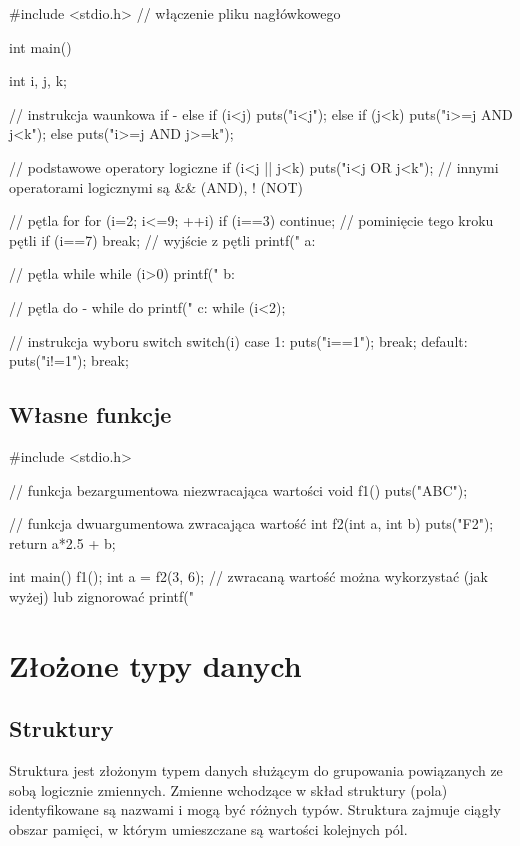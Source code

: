 \documentclass{pdfBooklets}
\begin{document}
\begin{CodeFrame*}[c]{}
#include <stdio.h> // włączenie pliku nagłówkowego

int main() {
    int i, j, k;
    
    // instrukcja waunkowa if - else
    if (i<j) {
        puts("i<j");
    } else if (j<k) {
        puts("i>=j AND j<k");
    } else {
        puts("i>=j AND j>=k");
    }
    
    // podstawowe operatory logiczne
    if (i<j || j<k)
        puts("i<j OR j<k");
    // innymi operatorami logicznymi są && (AND), ! (NOT)
    
    // pętla for
    for (i=2; i<=9; ++i) {
        if (i==3)
            continue; // pominięcie tego kroku pętli
        if (i==7)
            break; // wyjście z pętli
        printf(" a: %
    }
    
    // pętla while
    while (i>0) {
        printf(" b: %
    }
    
    // pętla do - while
    do {
        printf(" c: %
    } while (i<2);
    
    // instrukcja wyboru switch
    switch(i) {
        case 1:
            puts("i==1");
            break;
        default:
            puts("i!=1");
            break;
    }
}
\end{CodeFrame*}

\subsection{Własne funkcje}

\begin{CodeFrame*}[c]{}
#include <stdio.h>

// funkcja bezargumentowa niezwracająca wartości
void f1() {
    puts("ABC");
}

// funkcja dwuargumentowa zwracająca wartość
int f2(int a, int b) {
    puts("F2");
    return a*2.5 + b;
}

int main() {
    f1();
    int a = f2(3, 6);
    // zwracaną wartość można wykorzystać (jak wyżej) lub zignorować
    printf("%
}
\end{CodeFrame*}

\section{Złożone typy danych}

\subsection{Struktury}
Struktura jest złożonym typem danych służącym do grupowania powiązanych ze sobą logicznie zmiennych. Zmienne wchodzące w skład struktury (pola) identyfikowane są nazwami i mogą być różnych typów. Struktura zajmuje ciągły obszar pamięci, w którym umieszczane są wartości kolejnych pól. 
\end{document}
